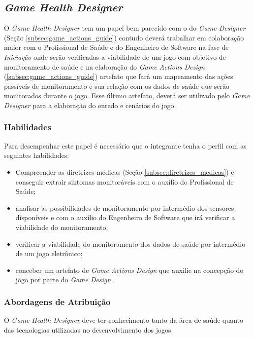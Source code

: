 \subsection{\textit{Game Health Designer}}
O \textit{Game Health Designer} tem um papel bem parecido com o do \textit{Game Designer} (Seção \ref{subsec:game_actions_guide}) contudo deverá trabalhar em colaboração maior com o Profissional de Saúde e do Engenheiro de Software na fase de \textit{Iniciação} onde serão verificadas a viabilidade de um jogo com objetivo de monitoramento de saúde e na elaboração do \textit{Game Actions Design} (\ref{subsec:game_actions_guide}) artefato que fará um mapeamento das ações passíveis de monitoramento e sua relação com os dados de saúde que serão monitorados durante o jogo. Esse último artefato, deverá ser utilizado pelo \textit{Game Designer} para a elaboração do enredo e cenários do jogo.

\subsubsection{Habilidades}
Para desempenhar este papel é necessário que o integrante tenha o perfil com as seguintes habilidades:
  \begin{itemize}
	  \item Compreender as diretrizes médicas (Seção \ref{subsec:diretrizes_medicas}) e conseguir extrair sintomas monitoráveis com o auxílio do Profissional de Saúde;
		\item analisar as possibilidades de monitoramento por intermédio dos sensores disponíveis e com o auxílio do Engenheiro de Software que irá verificar a viabilidade do monitoramento;
		\item verificar a viabilidade do monitoramento dos dados de saúde por intermédio de um jogo eletrônico;
		\item conceber um artefato de \textit{Game Actions Design} que auxilie na concepção do jogo por parte do \textit{Game Design}.
  \end{itemize}

\subsubsection{Abordagens de Atribuição}
O \textit{Game Health Designer} deve ter conhecimento tanto da área de saúde quanto das tecnologias utilizadas no desenvolvimento dos jogos.




